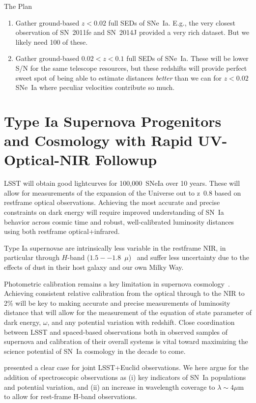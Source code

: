 \documentclass[12pt,preprint]{aastex}
\newcommand{\sneia}{SNe~Ia\xspace}
\begin{document}
The Plan
\begin{enumerate}
    \item Gather ground-based $z<0.02$ full SEDs of \sneia.  E.g., the very closest observation of SN~2011fe and SN~2014J provided a very rich dataset.  But we likely need 100 of these.
    \item Gather ground-based $0.02<z<0.1$ full SEDs of \sneia.  These will be lower S/N for the same telescope resources, but these redshifts will provide perfect sweet spot of being able to estimate distances {\em better} than we can for $z<0.02$ \sneia where peculiar velocities contribute so much.
\end{enumerate}
\fi

\section{Type Ia Supernova Progenitors and Cosmology with Rapid UV-Optical-NIR Followup}

LSST will obtain good lightcurves for 100,000~SNeIa over 10 years.  These will allow for measurements of the expansion of the Universe out to z~0.8 based on restframe optical observations.  Achieving the most accurate and precise constraints on dark energy will require improved understanding of SN~Ia behavior across cosmic time and robust, well-calibrated luminosity distances using both restframe optical+infrared.

Type Ia supernovae are intrinsically less variable in the restframe NIR, in particular through $H$-band ($1.5--1.8$~$\mu$)~\citep{Krisciunas04a, Krisciunas04b, Krisciunas04c, Wood-Vasey08, Contreras10, Stritzinger11, Kattner12} and suffer less uncertainty due to the effects of dust in their host galaxy and our own Milky Way.

Photometric calibration remains a key limitation in supernova cosmology~\citep{Scolnic18}.  Achieving consistent relative calibration from the optical through to the NIR to 2\% will be key to making accurate and precise measurements of luminosity distance that will allow for the measurement of the equation of state parameter of dark energy, $\omega$, and any potential variation with redshift.  Close coordination between LSST and spaced-based observations both in observed samples of supernova and calibration of their overall systems is vital toward maximizing the science potential of SN~Ia cosmology in the decade to come.

\citet{Astier14} presented a clear case for joint LSST+Euclid observations.  We here argue for the addition of spectroscopic observations as (i) key indicators of SN~Ia populations and potential variation, and (ii) an increase in wavelength coverage to $\lambda\sim4\mu$m to allow for rest-frame H-band observations.
\end{document}

